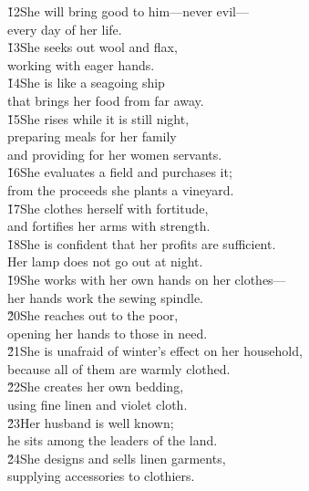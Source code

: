 \begin{poetry}
\poeml \v{12}She will bring good to him---never evil--- \\
\poemll    every day of her life. \\
\poeml \v{13}She seeks out wool and flax, \\
\poemll    working with eager hands. \\
\poeml \v{14}She is like a seagoing ship \\
\poemll    that brings her food from far away. \\
\poeml \v{15}She rises while it is still night, \\
\poemll    preparing meals for her family \\
\poemlll       and providing for her women servants. \\
\poeml \v{16}She evaluates a field and purchases it; \\
\poemll    from the proceeds she plants a vineyard. \\
\poeml \v{17}She clothes herself with fortitude, \\
\poemll    and fortifies her arms with strength. \\
\poeml \v{18}She is confident that her profits are sufficient. \\
\poemll    Her lamp does not go out at night. \\
\poeml \v{19}She works with her own hands on her clothes--- \\
\poemll    her hands work the sewing spindle. \\
\poeml \v{20}She reaches out to the poor, \\
\poemll    opening her hands to those in need. \\
\poeml \v{21}She is unafraid of winter's effect on her household, \\
\poemll    because all of them are warmly clothed. \\
\poeml \v{22}She creates her own bedding, \\
\poemll    using fine linen and violet cloth. \\
\poeml \v{23}Her husband is well known; \\
\poemll    he sits among the leaders of the land. \\
\poeml \v{24}She designs and sells linen garments, \\
\poemll    supplying accessories to clothiers. \\

\end{poetry}
